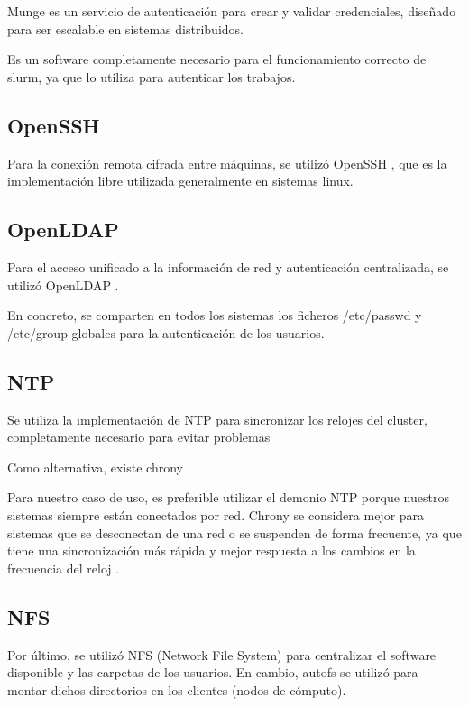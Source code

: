 Munge \cite{munge} es un servicio de autenticación para crear y validar credenciales, diseñado para ser escalable en sistemas distribuidos.
\vspace{2mm}

Es un software completamente necesario para el funcionamiento correcto de slurm, ya que lo utiliza para autenticar los trabajos.

\subsection{OpenSSH}

Para la conexión remota cifrada entre máquinas, se utilizó OpenSSH \cite{openssh}, que es la implementación libre utilizada generalmente en sistemas linux.

\subsection{OpenLDAP}

Para el acceso unificado a la información de red y autenticación centralizada, se utilizó OpenLDAP \cite{openldap}.

\vspace{2mm}

En concreto, se comparten en todos los sistemas los ficheros /etc/passwd y /etc/group globales para la autenticación de los usuarios.

\subsection{NTP}

Se utiliza la implementación de NTP para sincronizar los relojes del cluster, completamente necesario para evitar problemas
\vspace{2mm}

Como alternativa, existe chrony \cite{chrony}. 
\vspace{2mm}

Para nuestro caso de uso, es preferible utilizar el demonio NTP porque nuestros sistemas siempre están conectados por red. Chrony se considera mejor para sistemas que se desconectan de una red o se suspenden de forma frecuente, ya que tiene una sincronización más rápida y mejor respuesta a los cambios en la frecuencia del reloj \cite{chronyvsntp}.

\subsection{NFS}

Por último, se utilizó NFS \cite{nfs} (Network File System) para centralizar el software disponible y las carpetas de los usuarios. En cambio, autofs  \cite{nfsautofs} se utilizó para montar dichos directorios en los clientes (nodos de cómputo).


